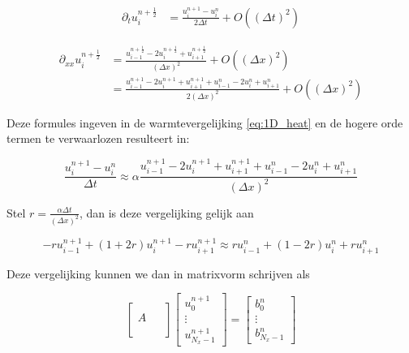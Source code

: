 \documentclass[a4paper,kulak]{kulakarticle} %
\begin{document}
\begin{align*}
	\partial_t u_i^{n+\frac{1}{2}} 
	&= \frac{u_i^{n+1} - u_i^n}{2\Delta t} + O((\Delta t)^2)
\end{align*}

\begin{align*}
	\partial_{xx} u_i^{n+\frac{1}{2}} 
	&= \frac{u_{i-1}^{n+\frac{1}{2}} - 2 u_i^{n+\frac{1}{2}} + u_{i+1}^{n+\frac{1}{2}}}{(\Delta x)^2} + O((\Delta x)^2) \\
	&= \frac{u_{i-1}^{n+1} - 2 u_i^{n+1} + u_{i+1}^{n+1} + u_{i-1}^n - 2 u_i^n + u_{i+1}^n}{2(\Delta x)^2} + O((\Delta x)^2)
\end{align*}

Deze formules ingeven in de warmtevergelijking \ref{eq:1D_heat} en de hogere orde termen te verwaarlozen resulteert in:

\begin{equation*}
	\frac{u_i^{n+1} - u_i^n}{\Delta t}
	\approx
	\alpha \frac{u_{i-1}^{n+1} - 2 u_i^{n+1} + u_{i+1}^{n+1} + u_{i-1}^n - 2 u_i^n + u_{i+1}^n}{(\Delta x)^2}
\end{equation*}

Stel $r = \frac{\alpha \Delta t}{(\Delta x)^2}$, dan is deze vergelijking gelijk aan

\begin{equation*}
	- r u_{i-1}^{n+1}
	+ \left(1 + 2r\right) u_i^{n+1}
	- r u_{i+1}^{n+1}
	\approx
	r u_{i-1}^n
	+ \left(1 - 2 r\right) u_i^n
	+ r u_{i+1}^n
\end{equation*}

Deze vergelijking kunnen we dan in matrixvorm schrijven als

\begin{equation}
	\begin{bmatrix}
		\qquad \\
		A \\
		\\ 
	\end{bmatrix}
	\begin{bmatrix}
		u_0^{n+1} \\
		\vdots \\
		u_{N_x - 1}^{n+1}
	\end{bmatrix}
	=
	\begin{bmatrix}
		b_0^n \\
		\vdots \\
		b_{N_x - 1}^n
	\end{bmatrix}	
\end{equation}
\end{document}
